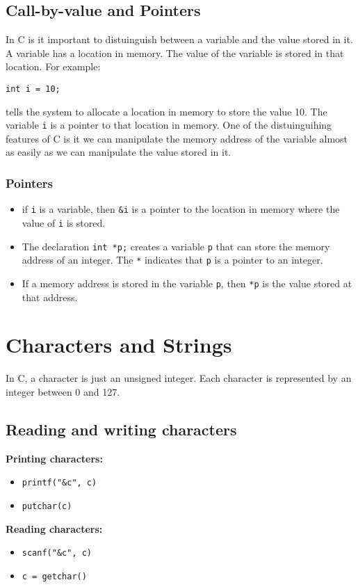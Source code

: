 \documentclass[a4paper, 10pt]{article}
\begin{document}
\subsection{Call-by-value and Pointers}
In C is it important to distuinguish between a variable and the value stored in it. A variable has a location in memory. The value of the variable is stored in that location. For example:
\begin{lstlisting}[style=cStyle]
int i = 10;
\end{lstlisting}
tells the system to allocate a location in memory to store the value 10. The variable \texttt{i} is a pointer to that location in memory. One of the distuinguihing features of C is it we can manipulate the memory address of the variable almost as easily as we can manipulate the value stored in it.
\subsubsection*{Pointers}
\begin{itemize}
    \item if \texttt{i} is a variable, then \texttt{\&i} is a pointer to the location in memory where the value of \texttt{i} is stored.
    \item The declaration \texttt{int *p;} creates a variable \texttt{p} that can store the memory address of an integer. The \texttt{*} indicates that \texttt{p} is a pointer to an integer.
    \item If a memory address is stored in the variable \texttt{p}, then \texttt{*p} is the value stored at that address.
\end{itemize}

\section{Characters and Strings}
In C, a character is just an unsigned integer. Each character is represented by an integer between 0 and 127.
\subsection{Reading and writing characters}
\begin{minipage}{0.45\textwidth}
    \textbf{Printing characters:}

    \begin{itemize}
        \item \texttt{printf("\&c", c)}
        \item \texttt{putchar(c)}
    \end{itemize}
\end{minipage}
\begin{minipage}{0.45\textwidth}
    \textbf{Reading characters:}
    \begin{itemize}
        \item \texttt{scanf("\&c", c)}
        \item \texttt{c = getchar()}
    \end{itemize}
\end{minipage}
\pagebreak
\end{document}
